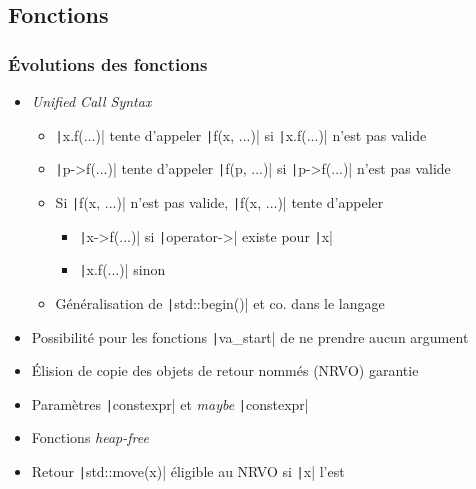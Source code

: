 \documentclass[C++.tex]{subfiles}
\begin{document}
\subsection*{Fonctions}
\begin{frame}[fragile]
	\frametitle{Évolutions des fonctions}
	\begin{itemize}
		\item \textit{Unified Call Syntax}
		\begin{itemize}
			\item \texttt|x.f(...)| tente d'appeler \texttt|f(x, ...)| si \texttt|x.f(...)| n'est pas valide
			\item \texttt|p->f(...)| tente d'appeler \texttt|f(p, ...)| si \texttt|p->f(...)| n'est pas valide
			\item Si \texttt|f(x, ...)| n'est pas valide, \texttt|f(x, ...)| tente d'appeler
			\begin{itemize}
				\item \texttt|x->f(...)| si \texttt|operator->| existe pour \texttt|x|
				\item \texttt|x.f(...)| sinon
			\end{itemize}
			\item Généralisation de \texttt|std::begin()| et co. dans le langage
		\end{itemize}
		\item Possibilité pour les fonctions \texttt|va_start| de ne prendre aucun argument
		\item Élision de copie des objets de retour nommés (NRVO) garantie


		\item Paramètres \texttt|constexpr| et \textit{maybe} \texttt|constexpr|
		\item Fonctions \textit{heap-free}
		\item Retour \texttt|std::move(x)| éligible au NRVO si \texttt|x| l'est
	\end{itemize}

\end{frame}
\end{document}
